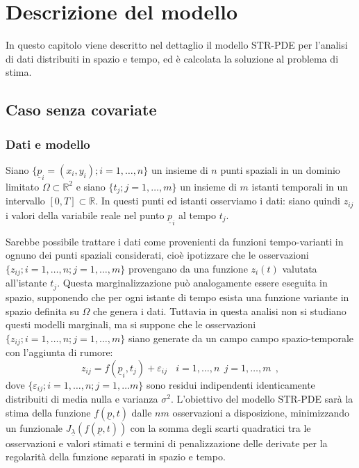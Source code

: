 \documentclass[a4paper,11pt,twoside,openright]{book}							%
\begin{document}
\listoffigures
\listoftables
\chapter{Descrizione del modello}

In questo capitolo viene descritto nel dettaglio il modello STR-PDE per l'analisi di dati distribuiti in spazio e tempo, ed è calcolata la soluzione al problema di stima.


\section{Caso senza covariate}

\subsection{Dati e modello}

Siano $\{\underline p_i = (x_i,y_i); i=1, \ldots , n\}$ un insieme di $n$ punti spaziali in un dominio limitato $\Omega \subset \mathbb R^2$ e siano $\{t_j ; j=1, \ldots , m\}$ un insieme di $m$ istanti temporali in un intervallo $[0,T]\subset \mathbb R$. In questi punti ed istanti osserviamo i dati: siano quindi $z_{ij}$ i valori della variabile reale nel punto $\underline p_i$ al tempo $t_j$.

Sarebbe possibile trattare i dati come provenienti da funzioni tempo-varianti in ognuno dei punti spaziali considerati, cioè ipotizzare che le osservazioni $\{ z_{ij};i=1, \ldots , n; j=1, \ldots , m \}$ provengano da una funzione $z_i(t)$ valutata all'istante $t_j$. Questa marginalizzazione può analogamente essere eseguita in spazio, supponendo che per ogni istante di tempo esista una funzione variante in spazio definita su $\Omega$ che genera i dati. Tuttavia in questa analisi non si studiano questi modelli marginali, ma si suppone che le osservazioni $\{z_{ij}; i=1, \ldots , n; j=1, \ldots , m\}$ siano generate da un campo campo spazio-temporale con  l'aggiunta di rumore:
\begin{equation}
\label{eq:modellobase}
z_{ij}=f(\underline p_i,t_j)+\varepsilon_{ij}\ \ \ \ i = 1,\ldots,n\ \ j=1,\ldots,m \ \ ,
\end{equation}
dove $\{ \varepsilon_{ij}; i = 1,\ldots ,n; j=1,\ldots m\}$ sono residui indipendenti identicamente distribuiti di media nulla e varianza $\sigma^2$. L'obiettivo del modello STR-PDE sarà la stima della funzione $f(\underline p,t)$ dalle $nm$ osservazioni a disposizione, minimizzando un funzionale $J_{\underline \lambda }(f(\underline p,t))$ con la somma degli scarti quadratici tra le osservazioni e valori stimati e termini di penalizzazione delle derivate per la regolarità della funzione separati in spazio e tempo.
\end{document}
